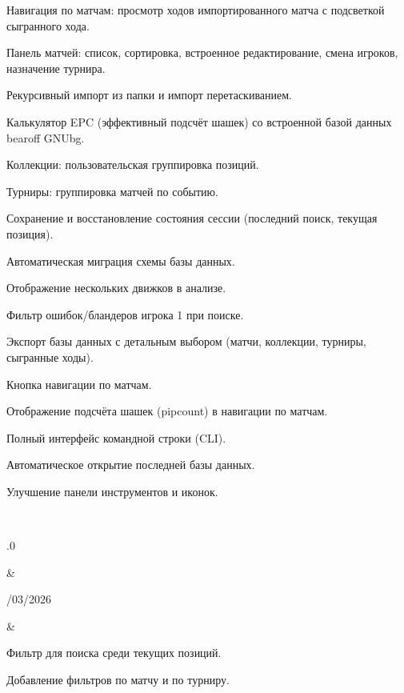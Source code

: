 \documentclass[letterpaper,10pt,russian]{sphinxmanual}
\begin{document}
\begin{savenotes}
\begin{longtable}{}
\begin{varwidth}[t]{}
\sphinxAtStartPar
Навигация по матчам: просмотр ходов импортированного матча с подсветкой сыгранного хода.

\sphinxAtStartPar
Панель матчей: список, сортировка, встроенное редактирование, смена игроков, назначение турнира.

\sphinxAtStartPar
Рекурсивный импорт из папки и импорт перетаскиванием.

\sphinxAtStartPar
Калькулятор EPC (эффективный подсчёт шашек) со встроенной базой данных bearoff GNUbg.

\sphinxAtStartPar
Коллекции: пользовательская группировка позиций.

\sphinxAtStartPar
Турниры: группировка матчей по событию.

\sphinxAtStartPar
Сохранение и восстановление состояния сессии (последний поиск, текущая позиция).

\sphinxAtStartPar
Автоматическая миграция схемы базы данных.

\sphinxAtStartPar
Отображение нескольких движков в анализе.

\sphinxAtStartPar
Фильтр ошибок/бландеров игрока 1 при поиске.

\sphinxAtStartPar
Экспорт базы данных с детальным выбором (матчи, коллекции, турниры, сыгранные ходы).

\sphinxAtStartPar
Кнопка навигации по матчам.

\sphinxAtStartPar
Отображение подсчёта шашек (pipcount) в навигации по матчам.

\sphinxAtStartPar
Полный интерфейс командной строки (CLI).

\sphinxAtStartPar
Автоматическое открытие последней базы данных.

\sphinxAtStartPar
Улучшение панели инструментов и иконок.
\sphinxbeforeendvarwidth
\end{varwidth}%
\\
\sphinxhline\begin{varwidth}[t]{}
.0
\sphinxbeforeendvarwidth
\end{varwidth}%
&\begin{varwidth}[t]{}
/03/2026
\sphinxbeforeendvarwidth
\end{varwidth}%
&\begin{varwidth}[t]{}
\sphinxAtStartPar
Фильтр для поиска среди текущих позиций.

\sphinxAtStartPar
Добавление фильтров по матчу и по турниру.


\end{varwidth}
\end{longtable}
\end{savenotes}
\end{document}

